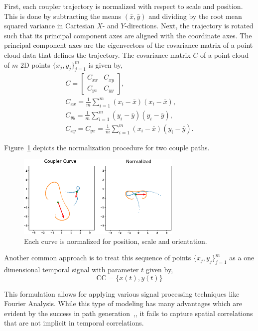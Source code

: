 First, each coupler trajectory is normalized with respect to scale and position.
This is done by subtracting the means $(\bar{x}, \bar{y})$ and dividing by the root mean squared variance in Cartesian $X$- and $Y$-directions.
Next, the trajectory is rotated such that its principal component axes are aligned with the coordinate axes.
The principal component axes are the eigenvectors of the covariance matrix of a point cloud data that defines the trajectory.
The covariance matrix $C$ of a point cloud of $m$ 2D points $\{x_j, y_j\}_{j=1}^{m}$ is given by,
\begin{eqnarray}
  C = \left[
\begin{array}{cc}
  C_{xx}  & C_{xy}  \\
  C_{yx}  & C_{yy}
\end{array}
\right],\\
C_{xx} = \frac {1}{m} \sum_{i=1}^{m}(x_i - \bar{x})(x_i - \bar{x}) ,\\
C_{yy} = \frac {1}{m} \sum_{i=1}^{m}(y_i - \bar{y})(y_i - \bar{y}) ,\\
C_{xy} = C_{yx} = \frac {1}{m} \sum_{i=1}^{m}(x_i - \bar{x})(y_i - \bar{y}).
\end{eqnarray}

Figure~\ref{fig_curve_normalization} depicts the normalization procedure for two couple paths.

\begin{figure}
\centering
\includegraphics[width=0.7\textwidth]{idetc-20/figure/fig_curve_normalization.eps}
  \caption{Each curve is normalized for position, scale and orientation.}
\label{fig_curve_normalization}
\end{figure}


Another common approach is to treat this sequence of points $\{x_j, y_j\}_{j=1}^{m}$ as a one dimensional temporal signal with parameter $t$ given by,  
\begin{equation*}
    \textrm{CC} = \{x(t), y(t)\}
\end{equation*}

This formulation allows for applying various signal processing techniques like Fourier Analysis. While this type of modeling has many advantages which are evident by the success in path generation~\cite{wu2011},\cite{ullah1997}, it fails to capture spatial correlations that are not implicit in temporal correlations.

